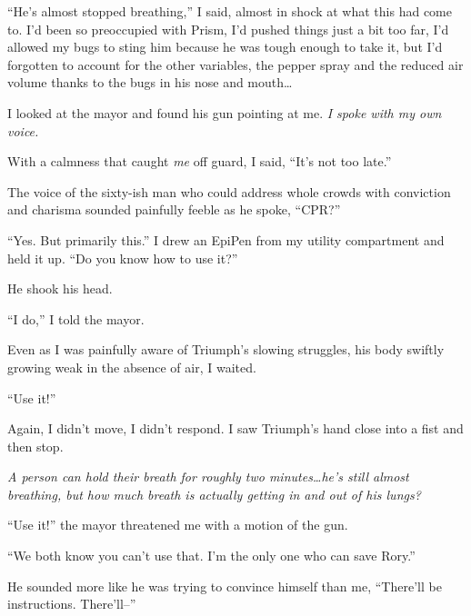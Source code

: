 ``He's almost stopped breathing,'' I said, almost in shock at what this had come to.  I'd been so preoccupied with Prism, I'd pushed things just a bit too far, I'd allowed my bugs to sting him because he was tough enough to take it, but I'd forgotten to account for the other variables, the pepper spray and the reduced air volume thanks to the bugs in his nose and mouth\ldots



I looked at the mayor and found his gun pointing at me.  \emph{I spoke with my own voice.}



With a calmness that caught \emph{me} off guard, I said, ``It's not too late.''



The voice of the sixty-ish man who could address whole crowds with conviction and charisma sounded painfully feeble as he spoke, ``CPR?''



``Yes.  But primarily this.''  I drew an EpiPen from my utility compartment and held it up.  ``Do you know how to use it?''



He shook his head.



``I do,'' I told the mayor.



Even as I was painfully aware of Triumph's slowing struggles, his body swiftly growing weak in the absence of air, I waited.



``Use it!''



Again, I didn't move, I didn't respond.  I saw Triumph's hand close into a fist and then stop.



\emph{A person can hold their breath for roughly two minutes\ldots he's still almost breathing, but how much breath is actually getting in and out of his lungs?}



``Use it!'' the mayor threatened me with a motion of the gun.



``We both know you can't use that.  I'm the only one who can save Rory.''



He sounded more like he was trying to convince himself than me, ``There'll be instructions.  There'll--''



